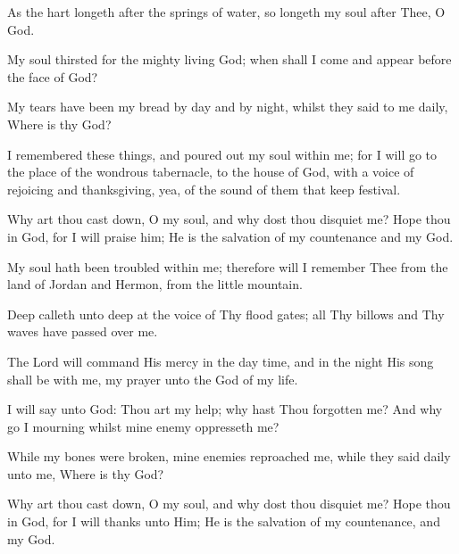 As the hart longeth after the springs of water, so longeth my soul after Thee, O God.

My soul thirsted for the mighty living God; when shall I come and appear before the face of God?

My tears have been my bread by day and by night, whilst they said to me daily, Where is thy God?

I remembered these things, and poured out my soul within me; for I will go to the place of the wondrous tabernacle, to the house of God, with a voice of rejoicing and thanksgiving, yea, of the sound of them that keep festival.

Why art thou cast down, O my soul, and why dost thou disquiet me? Hope thou in God, for I will praise him; He is the salvation of my countenance and my God.

My soul hath been troubled within me; therefore will I remember Thee from the land of Jordan and Hermon, from the little mountain.

Deep calleth unto deep at the voice of Thy flood gates; all Thy billows and Thy waves have passed over me.

The Lord will command His mercy in the day time, and in the night His song shall be with me, my prayer unto the God of my life.

I will say unto God: Thou art my help; why hast Thou forgotten me? And why go I mourning whilst mine enemy oppresseth me?

While my bones were broken, mine enemies reproached me, while they said daily unto me, Where is thy God?

Why art thou cast down, O my soul, and why dost thou disquiet me? Hope thou in God, for I will thanks unto Him; He is the salvation of my countenance, and my God.
